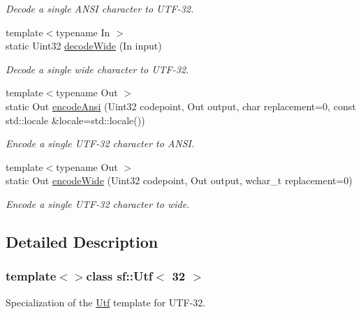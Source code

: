 \begin{DoxyCompactItemize}
\begin{DoxyCompactList}\small\item\em Decode a single A\+N\+S\+I character to U\+T\+F-\/32. \end{DoxyCompactList}\item 
{\footnotesize template$<$typename In $>$ }\\static Uint32 \hyperlink{classsf_1_1_utf_3_0132_01_4_a043fe25f5f4dbc205e78e6f1d99840dc}{decode\+Wide} (In input)
\begin{DoxyCompactList}\small\item\em Decode a single wide character to U\+T\+F-\/32. \end{DoxyCompactList}\item 
{\footnotesize template$<$typename Out $>$ }\\static Out \hyperlink{classsf_1_1_utf_3_0132_01_4_af6590226a071076ca22d818573a16ded}{encode\+Ansi} (Uint32 codepoint, Out output, char replacement=0, const std\+::locale \&locale=std\+::locale())
\begin{DoxyCompactList}\small\item\em Encode a single U\+T\+F-\/32 character to A\+N\+S\+I. \end{DoxyCompactList}\item 
{\footnotesize template$<$typename Out $>$ }\\static Out \hyperlink{classsf_1_1_utf_3_0132_01_4_a52e511e74ddc5df1bbf18f910193bc47}{encode\+Wide} (Uint32 codepoint, Out output, wchar\+\_\+t replacement=0)
\begin{DoxyCompactList}\small\item\em Encode a single U\+T\+F-\/32 character to wide. \end{DoxyCompactList}\end{DoxyCompactItemize}


\subsection{Detailed Description}
\subsubsection*{template$<$$>$class sf\+::\+Utf$<$ 32 $>$}

Specialization of the \hyperlink{singletonsf_1_1_utf}{Utf} template for U\+T\+F-\/32. 

